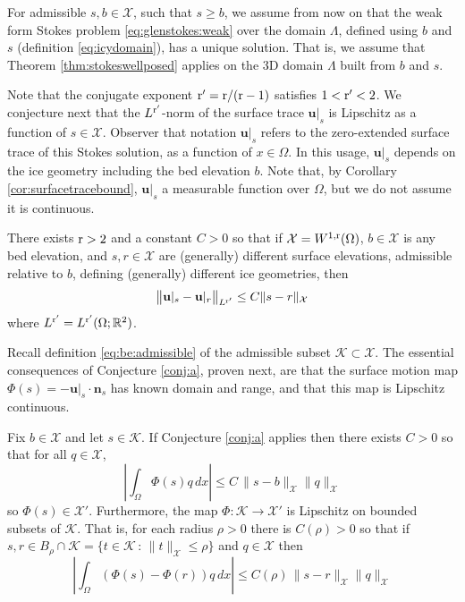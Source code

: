 \documentclass[hidelinks,onefignum,onetabnum,final]{siamart220329}  %
\newcommand{\RR}{\mathbb{R}}
\newcommand{\bn}{\mathbf{n}}
\newcommand{\bu}{\mathbf{u}}
\newcommand{\cK}{\mathcal{K}}
\newcommand{\cX}{\mathcal{X}}
\newcommand{\rr}{{\text{\textnormal{r}}}}
\begin{document}
For admissible $s,b\in \cX$, such that $s\ge b$, we assume from now on that the weak form Stokes problem \eqref{eq:glenstokes:weak} over the domain $\Lambda$, defined using $b$ and $s$ (definition \eqref{eq:icydomain}), has a unique solution.  That is, we assume that Theorem \ref{thm:stokeswellposed} applies on the 3D domain $\Lambda$ built from $b$ and $s$.

Note that the conjugate exponent $\rr'=\rr/(\rr-1)$ satisfies $1<\rr'<2$.  We conjecture next that the $L^{\rr'}$-norm of the surface trace $\bu|_s$ is Lipschitz as a function of $s \in \cX$.  Observer that notation $\bu|_s$ refers to the zero-extended surface trace of this Stokes solution, as a function of $x\in\Omega$.  In this usage, $\bu|_s$ depends on the ice geometry including the bed elevation $b$.  Note that, by Corollary \ref{cor:surfacetracebound}, $\bu|_s$ a measurable function over $\Omega$, but we do not assume it is continuous.

\begin{conjecture} \label{conj:a}  There exists $\rr>2$ and a constant $C>0$ so that if $\cX = W^{1,\rr}(\Omega)$, $b\in \cX$ is any bed elevation, and $s,r\in\cX$ are (generally) different surface elevations, admissible relative to $b$, defining (generally) different ice geometries, then
\begin{equation}
\big\|\bu|_s - \bu|_r\big\|_{L^{\rr'}} \le C \|s-r\|_{\cX} \label{eq:ulipschitz}
\end{equation}
where $L^{\rr'}=L^{\rr'}(\Omega;\RR^2)$.
\end{conjecture}

Recall definition \eqref{eq:be:admissible} of the admissible subset $\cK \subset \cX$.  The essential consequences of Conjecture \ref{conj:a}, proven next, are that the surface motion map $\Phi(s)=-\bu|_s\cdot \bn_s$ has known domain and range, and that this map is Lipschitz continuous.

\begin{lemma} \label{lem:philipschitz}
Fix $b \in \cX$ and let $s\in\cK$.  If Conjecture \ref{conj:a} applies then there exists $C>0$ so that for all $q\in\cX$,
\begin{equation}
\left|\int_\Omega \Phi(s) q\,dx\right| \le C\, \|s-b\|_{\cX} \|q\|_{\cX} \label{eq:phibound}
\end{equation}
so $\Phi(s)\in\cX'$.  Furthermore, the map $\Phi:\cK\to\cX'$ is Lipschitz on bounded subsets of $\cK$.  That is, for each radius $\rho>0$ there is $C(\rho)>0$ so that if $s,r\in B_\rho \cap \cK = \{t\in \cK\,:\,\|t\|_{\cX} \le \rho\}$ and $q\in\cX$ then
\begin{equation}
\left|\int_\Omega \left(\Phi(s) - \Phi(r)\right) q\,dx\right| \le C(\rho)\, \|s-r\|_{\cX} \|q\|_{\cX}  \label{eq:philipschitz}
\end{equation}
\end{lemma}
\end{document}
